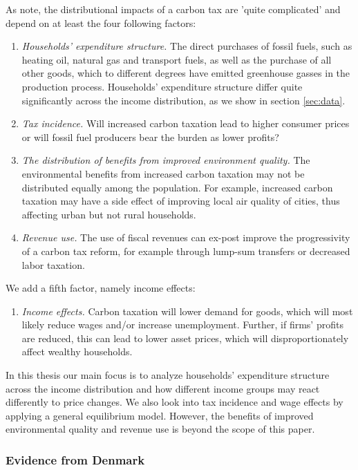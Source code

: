 As \cite{BARANZINI2000} note, the distributional impacts of a carbon tax are 'quite complicated' and depend on at least the four following factors: 
\begin{enumerate}
    \item \textit{Households' expenditure structure.} The direct purchases of fossil fuels, such as heating oil, natural gas and transport fuels, as well as the purchase of all other goods, which to different degrees have emitted greenhouse gasses in the production process. Households' expenditure structure differ quite significantly across the income distribution, as we show in section \ref{sec:data}.
    \item \textit{Tax incidence.} Will increased carbon taxation lead to higher consumer prices or will fossil fuel producers bear the burden as lower profits? 
    \item \textit{The distribution of benefits from improved environment quality.} The environmental benefits from increased carbon taxation may not be distributed equally among the population. For example, increased carbon taxation may have a side effect of improving local air quality of cities, thus affecting urban but not rural households. 
    \item \textit{Revenue use.} The use of fiscal revenues can ex-post improve the progressivity of a carbon tax reform, for example through lump-sum transfers or decreased labor taxation.
\end{enumerate}
We add a fifth factor, namely income effects:
\begin{enumerate}[resume]
    \item \textit{Income effects.} Carbon taxation will lower demand for goods, which will most likely reduce wages and/or increase unemployment. Further, if firms' profits are reduced, this can lead to lower asset prices, which will disproportionately affect wealthy households. 
\end{enumerate}
In this thesis our main focus is to analyze households' expenditure structure across the income distribution and how different income groups may react differently to price changes. We also look into tax incidence and wage effects by applying a general equilibrium model. However, the benefits of improved environmental quality and revenue use is beyond the scope of this paper. 


\subsubsection{Evidence from Denmark} 
 
